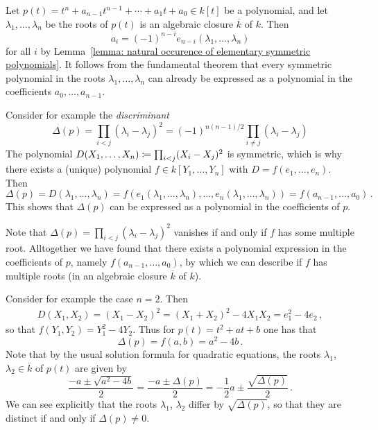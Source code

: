\begin{example}
  Let $p(t) = t^n + a_{n-1} t^{n-1} + \dotsb + a_1 t + a_0 \in k[t]$ be a polynomial, and let $\lambda_1, \dotsc, \lambda_n$ be the roots of $p(t)$ is an algebraic closure $\overline{k}$ of $k$.
  Then
  \[
      a_i
    = (-1)^{n-i} e_{n-i}(\lambda_1, \dotsc, \lambda_n)
  \]
  for all $i$ by Lemma~\ref{lemma: natural occurence of elementary symmetric polynomials}.
  It follows from the fundamental theorem that every symmetric polynomial in the roots $\lambda_1, \dotsc, \lambda_n$ can already be expressed as a polynomial in the coefficients $a_0, \dotsc, a_{n-1}$.
  
  Consider for example the \emph{discriminant}
  \[
      \Delta(p)
    = \prod_{i < j} (\lambda_i - \lambda_j)^2
    = (-1)^{n(n-1)/2} \prod_{i \neq j} (\lambda_i - \lambda_j)
  \]
  The polynomial $D(X_1, \dotsc, X_n) \coloneqq \prod_{i < j} (X_i - X_j)^2$ is symmetric, which is why there exists a (unique) polynomial $f \in k[Y_1, \dotsc, Y_n]$ with $D = f(e_1, \dotsc, e_n)$.
  Then
  \[
      \Delta(p)
    = D(\lambda_1, \dotsc, \lambda_n)
    = f(e_1(\lambda_1, \dotsc, \lambda_n), \dotsc, e_n(\lambda_1, \dotsc, \lambda_n))
    = f(a_{n-1}, \dotsc, a_0) \,.
  \]
  This shows that $\Delta(p)$ can be expressed as a polynomial in the coefficients of $p$.
  
  Note that $\Delta(p) = \prod_{i < j} (\lambda_i - \lambda_j)^2$ vanishes if and only if $f$ has some multiple root.
  Alltogether we have found that there exists a polynomial expression in the coefficients of $p$, namely $f(a_{n-1}, \dotsc, a_0)$, by which we can describe if $f$ has multiple roots (in an algebraic closure $\overline{k}$ of $k$).
  
  Consider for example the case $n = 2$.
  Then
  \begin{align*}
        D(X_1, X_2)
     =  (X_1 - X_2)^2
     =  (X_1 + X_2)^2 - 4 X_1 X_2
     =  e_1^2 - 4 e_2 \,,
  \end{align*}
  so that $f(Y_1, Y_2) = Y_1^2 - 4 Y_2$.
  Thus for $p(t) = t^2 + a t + b$ one has that
  \[
      \Delta(p)
    = f(a,b)
    = a^2 - 4 b \,.
  \]
  Note that by the usual solution formula for quadratic equations, the roots $\lambda_1$, $\lambda_2 \in \overline{k}$ of $p(t)$ are given by
  \[
      \frac{-a \pm \sqrt{a^2 - 4b}}{2}
    = \frac{-a \pm \Delta(p)}{2}
    = -\frac{1}{2} a \pm \frac{\sqrt{\Delta(p)}}{2} \,.
  \]
  We can see explicitly that the roots $\lambda_1$, $\lambda_2$ differ by $\sqrt{\Delta(p)}$, so that they are distinct if and only if $\Delta(p) \neq 0$.
\end{example}


